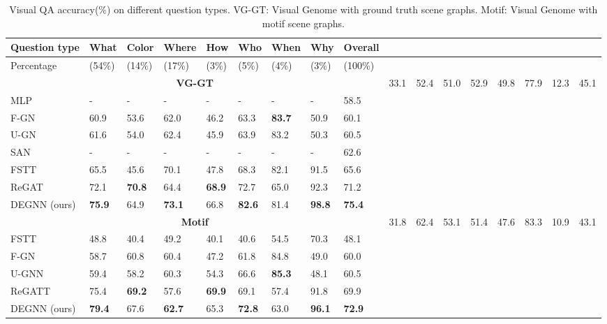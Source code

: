 \documentclass[letterpaper]{article} %
\begin{document}
\begin{table}[ht] 
\centering
    \begin{tabular}{l|lllllllll}
    \hline
    \textbf{Question type}&\textbf{What}&\textbf{Color}&\textbf{Where}&\textbf{How}&\textbf{Who}&\textbf{When}&\textbf{Why}&\textbf{Overall}\\
    \hline
     Percentage &(54\%) &(14\%) &(17\%) &(3\%) &(5\%) &(4\%) &(3\%) &(100\%)\\
    \hline
    \multicolumn{9}{c}{\bf VG-GT} \cr\hline %
     NSM~\cite{DBLP:conf/nips/HudsonM19} &33.1 &52.4 &51.0 &52.9 &49.8 &77.9 &12.3 &45.1\\
     MLP~\cite{DBLP:conf/eccv/JabriJM16} &- &- &- &- &- &- &- &58.5\\
     F-GN~\cite{DBLP:conf/bmvc/ZhangCX19}&60.9 &53.6 &62.0 &46.2 &63.3 &\textbf{83.7} &50.9 &60.1\\
     U-GN~\cite{DBLP:conf/bmvc/ZhangCX19}&61.6 &54.0 &62.4 &45.9 &63.9 & 83.2 &50.3 &60.5\\
     SAN~\cite{DBLP:conf/cvpr/YangHGDS16} &- &- &- &- &- &- &- &62.6\\
     FSTT~\cite{inproceedings} &65.5 &45.6 &70.1 &47.8 &68.3 &82.1 &91.5 &65.6\\
     ReGAT~\cite{DBLP:conf/iccv/LiGCL19} &72.1 &\textbf{70.8} &64.4 &\textbf{68.9} &72.7 &65.0 &92.3 &71.2\\
     DEGNN (ours) &\textbf{75.9} &64.9 &\textbf{73.1} &66.8 &\textbf{82.6} &81.4 &\textbf{98.8} &\textbf{75.4}\\
    \hline
     \multicolumn{9}{c}{\bf Motif} \cr\hline
     NSM~\cite{DBLP:conf/nips/HudsonM19} &31.8 &62.4 &53.1 &51.4 &47.6 &83.3 &10.9 &43.1\\
     FSTT~\cite{inproceedings} &48.8 &40.4 &49.2 &40.1 &40.6 &54.5 &70.3 &48.1\\
     F-GN~\cite{DBLP:conf/bmvc/ZhangCX19} &58.7 &60.8 &60.4 &47.2 &61.8 &84.8 &49.0 &60.0\\
     U-GNN~\cite{DBLP:conf/bmvc/ZhangCX19} &59.4 &58.2 &60.3 &54.3 &66.6 &\textbf{85.3} &48.1 &60.5\\
     ReGATT~\cite{DBLP:conf/iccv/LiGCL19} &75.4 &\textbf{69.2} &57.6 &\textbf{69.9} &69.1 &57.4 &91.8 &69.9\\
     DEGNN (ours) &\textbf{79.4} &67.6 &\textbf{62.7} &65.3 &\textbf{72.8} &63.0 &\textbf{96.1} &\textbf{72.9}\\
    \hline
    \end{tabular}
\caption{\label{VG-detail}
Visual QA accuracy(\%) on different question types. VG-GT: Visual Genome with ground truth scene graphs. Motif: Visual Genome with motif scene graphs.
}
\end{table}
\end{document}
